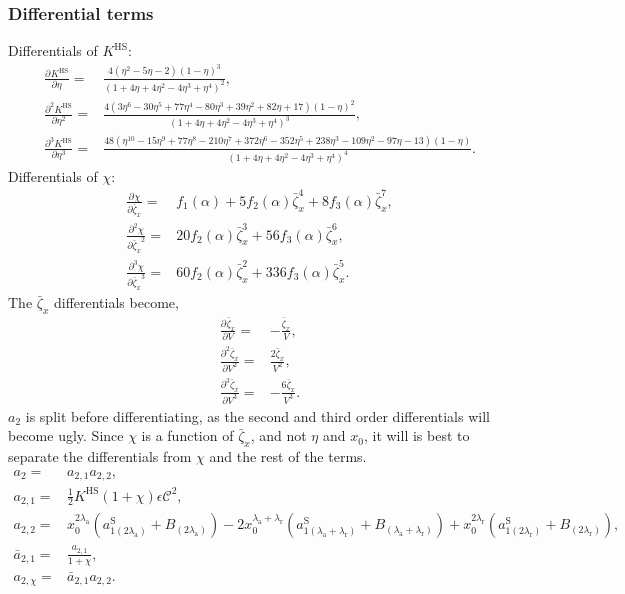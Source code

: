 \documentclass[english]{../thermomemo/thermomemo}
\newcommand*{\pd}[3][]{\frac{\partial^{#1}#2}{\partial{#3}^{#1}}}%
\newcommand*{\lb}{\left(}
\newcommand*{\rb}{\right)}
\newcommand{\hs}{\text{HS}\xspace}
\newcommand{\lama}{\ensuremath{{\lambda_{\text{a}}}}\xspace}
\newcommand{\lamr}{\ensuremath{{\lambda_{\text{r}}}}\xspace}
\newcommand{\ab}{\ensuremath{\bar{a}}\xspace}
\newcommand*{\aSl}[1]{\ensuremath{a_{1{#1}}^{\text{S}}}\xspace}
\newcommand{\zb}{\bar{\zeta}}
\begin{document}
\subsubsection{Differential terms}
Differentials of $K^\hs$:
\begin{align}
  \label{eq:K_hs_diff}
  \pd{K^\hs}{\eta} =& \frac{4 \lb \eta^2 - 5 \eta - 2 \rb \lb 1 - \eta \rb^3}{\lb 1 + 4 \eta + 4 \eta^2 - 4 \eta^3 +  \eta^4\rb^2},\\
  \pd[2]{K^\hs}{\eta} =& \frac{4 \lb 3 \eta^6 - 30 \eta^5 + 77 \eta^4 - 80 \eta^3 + 39 \eta^2 + 82 \eta + 17 \rb \lb 1 - \eta \rb^2}{\lb 1 + 4 \eta + 4 \eta^2 - 4 \eta^3 +  \eta^4\rb^3},\\
  \pd[3]{K^\hs}{\eta} =& \frac{48 \lb \eta^{10} - 15 \eta^9 + 77 \eta^8 - 210 \eta^7 + 372 \eta^6 - 352 \eta^5 + 238 \eta^3 - 109 \eta^2 - 97 \eta - 13  \rb \lb 1 - \eta \rb}{\lb 1 + 4 \eta + 4 \eta^2 - 4 \eta^3 +  \eta^4\rb^4}.
\end{align}
Differentials of $\chi$:
\begin{align}
  \label{eq:chi_diff}
  \pd{\chi}{\zb_x} =& f_1\lb \alpha \rb + 5 f_2\lb \alpha \rb \zb_x^4 + 8 f_3 \lb \alpha \rb \zb_x^7,\\
  \pd[2]{\chi}{\zb_x} =& 20 f_2\lb \alpha \rb \zb_x^3 + 56 f_3 \lb \alpha \rb \zb_x^6, \\
  \pd[3]{\chi}{\zb_x} =& 60 f_2\lb \alpha \rb \zb_x^2 + 336 f_3 \lb \alpha \rb \zb_x^5.
\end{align}
The $\zb_x$ differentials become,
\begin{align}
  \label{eq:zxb_diff}
  \pd{\zb_x}{V} =& -\frac{\zb_x}{V}, \\
  \pd[2]{\zb_x}{V} =& \frac{2\zb_x}{V^2}, \\
  \pd[3]{\zb_x}{V}  =& -\frac{6\zb_x}{V^3}.
\end{align}
$a_2$ is split before differentiating, as the second and third order
differentials will become ugly. Since $\chi$ is a function of $\zb_x$,
and not $\eta$ and $x_0$, it will is best to separate the
differentials from $\chi$ and the rest of the terms.
\begin{align}
  \label{eq:a_2_split}
  a_2 =& a_{2,1}a_{2,2},\\
  a_{2,1} =& \frac{1}{2} K^\hs \lb 1 + \chi \rb \epsilon \mathcal{C}^2 ,\\
  a_{2,2} =& x_0^{2\lama}\lb \aSl{\lb 2\lama\rb} + B_{\lb 2\lama\rb}\rb
       -2x_0^{\lama + \lamr}\lb \aSl{\lb\lama + \lamr\rb}  + B_{\lb\lama + \lamr\rb}\rb
             + x_0^{2\lamr}\lb \aSl{\lb 2\lamr\rb} + B_{\lb 2\lamr\rb}\rb,\\
  \ab_{2,1} =& \frac{a_{2,1}}{1 + \chi},\\
  a_{2,\chi} =& \ab_{2,1}a_{2,2}.\\
\end{align}
\end{document}
